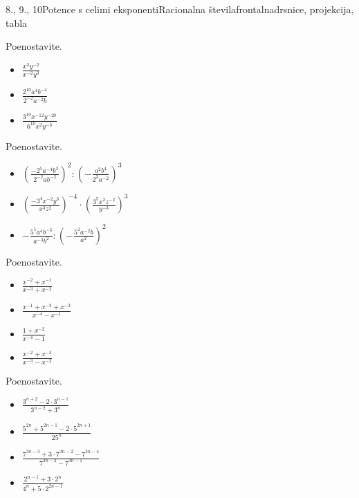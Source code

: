 \begin{priprava}{8., 9., 10}{}{Potence s celimi eksponenti}{Racionalna števila}{frontalna}{drsnice, projekcija, tabla}
\begin{multicols}{2}
            \begin{naloga}
                Poenostavite.
                \begin{itemize}
                    \item $\frac{x^3y^{-2}}{x^{-2}y^3}$ 
                    \item $\frac{2^{10}a^4b^{-4}}{2^{-2}a^{-2}b}$ 
                    \item $\frac{3^{10}x^{-12}y^{-20}}{6^{10}x^2y^{-3}}$ 
                \end{itemize}
            \end{naloga}


            \begin{naloga}
                Poenostavite.
                \begin{itemize}
                    \item $\left(\frac{-2^5a^{-4}b^3}{2^{-2}ab^{-2}}\right)^2:\left(-\frac{a^2b^4}{2^3a^{-2}}\right)^3$ 
                    \item $\left(\frac{-3^4x^{-2}y^3}{x^3z^2}\right)^{-4}\cdot\left(\frac{3^5x^2z^{-2}}{y^{-3}}\right)^3$ 
                    \item $-\frac{5^5a^4b^{-3}}{a^{-3}b^2}:\left(-\frac{5^2a^{-2}b}{a^2}\right)^2$ 
                \end{itemize}
            \end{naloga}


            \begin{naloga}
                Poenostavite.
                \begin{itemize}
                    \item $\frac{x^{-2}+x^{-1}}{x^{-3}+x^{-2}}$ 
                    \item $\frac{x^{-1}+x^{-2}+x^{-3}}{x^{-4}-x^{-1}}$ 
                    \item $\frac{1+x^{-2}}{x^{-4}-1}$ 
                    \item $\frac{x^{-2}+x^{-3}}{x^{-3}-x^{-2}}$ 
                \end{itemize}
            \end{naloga}


        
            \begin{naloga}
                Poenostavite.
                \begin{itemize}
                    \item $\frac{3^{n+2}-2\cdot 3^{n-1}}{3^{n-2}+3^n}$ 
                    \item $\frac{5^{2n}+5^{2n-1}-2\cdot 5^{2n+1}}{25^n}$ 
                    \item $\frac{7^{3n-3}+3\cdot 7^{3n-2}-7^{3n-4}}{7^{3n-2}-7^{3n-1}}$ 
                    \item $\frac{2^{n-1}+3\cdot 2^n}{4^n+5\cdot 2^{2n-1}}$ 
                \end{itemize}
            \end{naloga}



\end{multicols}
\end{priprava}
